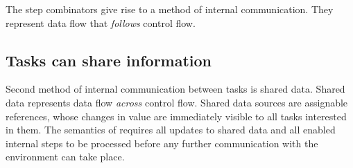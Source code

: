 The step combinators give rise to a method of internal communication.
They represent data flow that \emph{follows} control flow.




\subsection{Tasks can share information}

Second method of internal communication between tasks is shared data.
Shared data represents data flow \emph{across} control flow.
Shared data sources are assignable references, whose changes in value are immediately visible to all tasks interested in them.
The semantics of \TOPHAT requires all updates to shared data and all enabled internal steps to be processed before any further communication with the environment can take place.


